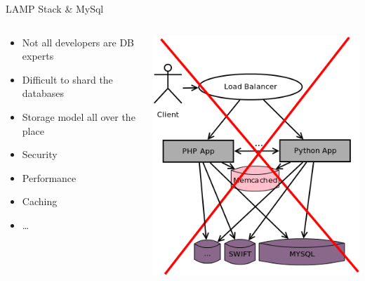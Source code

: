 \documentclass[aspectratio=169]{beamer}
\begin{document}
\begin{frame}{LAMP Stack \& MySql}
    \begin{columns}
        \begin{column}[c]{0.65\textwidth}
            \begin{itemize}
                \item Not all developers are DB experts
                \item Difficult to shard the databases
                \item Storage model all over the place
                \item Security
                \item Performance
                \item Caching
                \item \dots
            \end{itemize}
        \end{column}
        \begin{column}[c]{0.35\textwidth}
            \includegraphics[width=\textwidth]{images/oldstorageusage.png}
        \end{column}
    \end{columns}
\end{frame}
\end{document}
